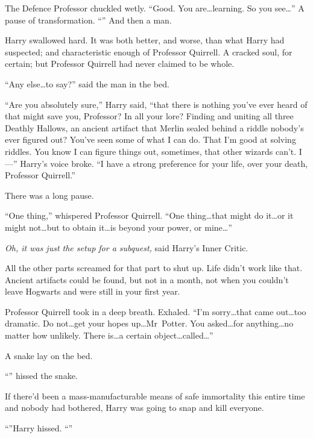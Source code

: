 The Defence Professor chuckled wetly. “Good. You are…learning. So you see…” A pause of transformation. “” And then a man.

Harry swallowed hard. It was both better, and worse, than what Harry had suspected; and characteristic enough of Professor Quirrell. A cracked soul, for certain; but Professor Quirrell had never claimed to be whole.

“Any else…to say?” said the man in the bed.

“Are you absolutely sure,” Harry said, “that there is nothing you’ve ever heard of that might save you, Professor? In all your lore? Finding and uniting all three Deathly Hallows, an ancient artifact that Merlin sealed behind a riddle nobody’s ever figured out? You’ve seen some of what I can do. That I’m good at solving riddles. You know I can figure things out, sometimes, that other wizards can’t. I—” Harry’s voice broke. “I have a strong preference for your life, over your death, Professor Quirrell.”

There was a long pause.

“One thing,” whispered Professor Quirrell. “One thing…that might do it…or it might not…but to obtain it…is beyond your power, or mine…”

\emph{Oh, it was just the setup for a subquest,} said Harry’s Inner Critic.

All the other parts screamed for that part to shut up. Life didn’t work like that. Ancient artifacts could be found, but not in a month, not when you couldn’t leave Hogwarts and were still in your first year.

Professor Quirrell took in a deep breath. Exhaled. “I’m sorry…that came out…too dramatic. Do not…get your hopes up…Mr~Potter. You asked…for anything…no matter how unlikely. There is…a certain object…called…”

A snake lay on the bed.

“” hissed the snake.

If there’d been a mass-manufacturable means of safe immortality this entire time and nobody had bothered, Harry was going to snap and kill everyone.

“”Harry hissed. “”

